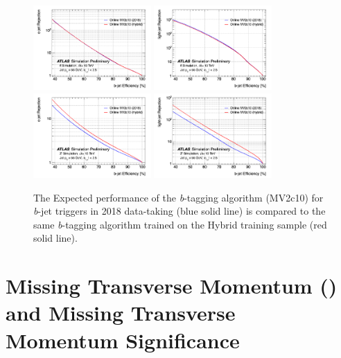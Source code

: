 \begin{figure}[htbp]
    \centering 
    \includegraphics[width=0.4\textwidth]{chapters/c5/figures/ROC_cb}
    \includegraphics[width=0.4\textwidth]{chapters/c5/figures/ROC_lb}
    \includegraphics[width=0.4\textwidth]{chapters/c5/figures/ROC_cb_Zprime}
    \includegraphics[width=0.4\textwidth]{chapters/c5/figures/ROC_lb_Zprime}
    \caption{The Expected performance of the \textit{b}-tagging algorithm (MV2c10) for \textit{b}-jet triggers in 2018 data-taking (blue solid line) is compared to the same \textit{b}-tagging algorithm trained on the Hybrid training sample (red solid line).}
    \label{fig:mv2c10}
\end{figure}

\section{Missing Transverse Momentum (\met) and Missing Transverse Momentum Significance}
\label{sec:met}

